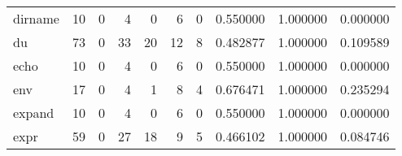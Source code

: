 \begin{tabular}{lrrrrrrrrr}
dirname   &                                       10 &                                                  0 &                                                  4 &                                                  0 &                                                  6 &                                                  0 &                                           0.550000 &                               1.000000 &                             0.000000 \\
du        &                                       73 &                                                  0 &                                                 33 &                                                 20 &                                                 12 &                                                  8 &                                           0.482877 &                               1.000000 &                             0.109589 \\
echo      &                                       10 &                                                  0 &                                                  4 &                                                  0 &                                                  6 &                                                  0 &                                           0.550000 &                               1.000000 &                             0.000000 \\
env       &                                       17 &                                                  0 &                                                  4 &                                                  1 &                                                  8 &                                                  4 &                                           0.676471 &                               1.000000 &                             0.235294 \\
expand    &                                       10 &                                                  0 &                                                  4 &                                                  0 &                                                  6 &                                                  0 &                                           0.550000 &                               1.000000 &                             0.000000 \\
expr      &                                       59 &                                                  0 &                                                 27 &                                                 18 &                                                  9 &                                                  5 &                                           0.466102 &                               1.000000 &                             0.084746 \\

\end{tabular}
